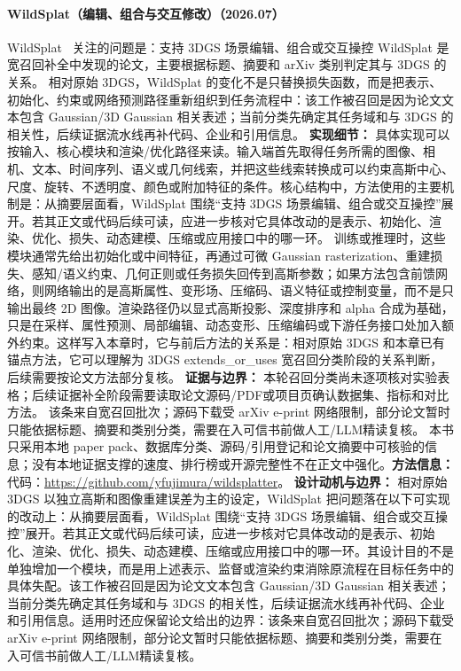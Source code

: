 \paragraph{WildSplat（编辑、组合与交互修改）（2026.07）}
WildSplat~\cite{2607_05347} 关注的问题是：支持 3DGS 场景编辑、组合或交互操控 WildSplat 是宽召回补全中发现的论文，主要根据标题、摘要和 arXiv 类别判定其与 3DGS 的关系。
相对原始 3DGS，WildSplat 的变化不是只替换损失函数，而是把表示、初始化、约束或网络预测路径重新组织到任务流程中：该工作被召回是因为论文文本包含 Gaussian/3D Gaussian 相关表述；当前分类先确定其任务域和与 3DGS 的相关性，后续证据流水线再补代码、企业和引用信息。
\textbf{实现细节：} 具体实现可以按输入、核心模块和渲染/优化路径来读。输入端首先取得任务所需的图像、相机、文本、时间序列、语义或几何线索，并把这些线索转换成可以约束高斯中心、尺度、旋转、不透明度、颜色或附加特征的条件。核心结构中，方法使用的主要机制是：从摘要层面看，WildSplat 围绕“支持 3DGS 场景编辑、组合或交互操控”展开。若其正文或代码后续可读，应进一步核对它具体改动的是表示、初始化、渲染、优化、损失、动态建模、压缩或应用接口中的哪一环。 训练或推理时，这些模块通常先给出初始化或中间特征，再通过可微 Gaussian rasterization、重建损失、感知/语义约束、几何正则或任务损失回传到高斯参数；如果方法包含前馈网络，则网络输出的是高斯属性、变形场、压缩码、语义特征或控制变量，而不是只输出最终 2D 图像。渲染路径仍以显式高斯投影、深度排序和 alpha 合成为基础，只是在采样、属性预测、局部编辑、动态变形、压缩编码或下游任务接口处加入额外约束。这样写入本章时，它与前后方法的关系是：相对原始 3DGS 和本章已有锚点方法，它可以理解为 3DGS extends\_or\_uses 宽召回分类阶段的关系判断，后续需要按论文方法部分复核。
\textbf{证据与边界：} 本轮召回分类尚未逐项核对实验表格；后续证据补全阶段需要读取论文源码/PDF或项目页确认数据集、指标和对比方法。 该条来自宽召回批次；源码下载受 arXiv e-print 网络限制，部分论文暂时只能依据标题、摘要和类别分类，需要在入可信书前做人工/LLM精读复核。 本书只采用本地 paper pack、数据库分类、源码/引用登记和论文摘要中可核验的信息；没有本地证据支撑的速度、排行榜或开源完整性不在正文中强化。\textbf{方法信息：} 代码：\url{https://github.com/yfujimura/wildsplatter}。
\textbf{设计动机与边界：} 相对原始 3DGS 以独立高斯和图像重建误差为主的设定，WildSplat 把问题落在以下可实现的改动上：从摘要层面看，WildSplat 围绕“支持 3DGS 场景编辑、组合或交互操控”展开。若其正文或代码后续可读，应进一步核对它具体改动的是表示、初始化、渲染、优化、损失、动态建模、压缩或应用接口中的哪一环。其设计目的不是单独增加一个模块，而是用上述表示、监督或渲染约束消除原流程在目标任务中的具体失配。该工作被召回是因为论文文本包含 Gaussian/3D Gaussian 相关表述；当前分类先确定其任务域和与 3DGS 的相关性，后续证据流水线再补代码、企业和引用信息。适用时还应保留论文给出的边界：该条来自宽召回批次；源码下载受 arXiv e-print 网络限制，部分论文暂时只能依据标题、摘要和类别分类，需要在入可信书前做人工/LLM精读复核。
